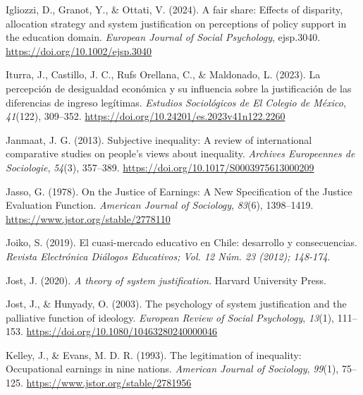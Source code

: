 \documentclass[
  12pt,
  a4paper,
]{article}
\newlength{\cslhangindent}
\newlength{\cslentryspacingunit} %
\newenvironment{CSLReferences}[2] %
 {%
  \setlength{\parindent}{0pt}
  \ifodd #1
  \let\oldpar\par
  \def\par{\hangindent=\cslhangindent\oldpar}
  \fi
  \setlength{\parskip}{#2\cslentryspacingunit}
 }%
 {}
\begin{document}
\begin{CSLReferences}{1}{0}
\leavevmode{}%
Igliozzi, D., Granot, Y., \& Ottati, V. (2024). A fair share: {Effects}
of disparity, allocation strategy and system justification on
perceptions of policy support in the education domain. \emph{European
Journal of Social Psychology}, ejsp.3040.
\url{https://doi.org/10.1002/ejsp.3040}

\leavevmode{}%
Iturra, J., Castillo, J. C., Rufs Orellana, C., \& Maldonado, L. (2023).
La percepci{ó}n de desigualdad econ{ó}mica y su influencia sobre la
justificaci{ó}n de las diferencias de ingreso leg{í}timas.
\emph{Estudios Sociol{ó}gicos de El Colegio de M{é}xico},
\emph{41}(122), 309--352.
\url{https://doi.org/10.24201/es.2023v41n122.2260}

\leavevmode{}%
Janmaat, J. G. (2013). Subjective inequality: {A} review of
international comparative studies on people's views about inequality.
\emph{Archives Europeennes de Sociologie}, \emph{54}(3), 357--389.
\url{https://doi.org/10.1017/S0003975613000209}

\leavevmode{}%
Jasso, G. (1978). On the {Justice} of {Earnings}: {A New Specification}
of the {Justice Evaluation Function}. \emph{American Journal of
Sociology}, \emph{83}(6), 1398--1419.
\url{https://www.jstor.org/stable/2778110}

\leavevmode{}%
Joiko, S. (2019). {El cuasi-mercado educativo en Chile: desarrollo y
consecuencias}. \emph{Revista Electr{ó}nica Di{á}logos Educativos; Vol.
12 N{ú}m. 23 (2012); 148-174}.

\leavevmode{}%
Jost, J. (2020). \emph{A theory of system justification}. Harvard
University Press.

\leavevmode{}%
Jost, J., \& Hunyady, O. (2003). The psychology of system justification
and the palliative function of ideology. \emph{European Review of Social
Psychology}, \emph{13}(1), 111--153.
\url{https://doi.org/10.1080/10463280240000046}

\leavevmode{}%
Kelley, J., \& Evans, M. D. R. (1993). The legitimation of inequality:
{Occupational} earnings in nine nations. \emph{American Journal of
Sociology}, \emph{99}(1), 75--125.
\url{https://www.jstor.org/stable/2781956}


\end{CSLReferences}
\end{document}
